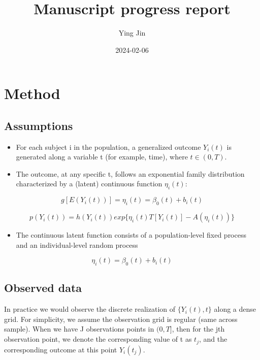 \documentclass[
]{article}
\title{Manuscript progress report}
\author{Ying Jin}
\date{2024-02-06}
\providecommand{\tightlist}{%
  \setlength{\itemsep}{0pt}\setlength{\parskip}{0pt}}
\begin{document}
\maketitle

{
\setcounter{tocdepth}{3}
\tableofcontents
}
\hypertarget{method}{%
\section{Method}\label{method}}

\hypertarget{assumptions}{%
\subsection{Assumptions}\label{assumptions}}

\begin{itemize}
\tightlist
\item
  For each subject i in the population, a generalized outcome \(Y_i(t)\)
  is generated along a variable t (for example, time), where
  \(t \in (0, T)\).
\item
  The outcome, at any specific t, follows an exponential family
  distribution characterized by a (latent) continuous function
  \(\eta_i(t)\):
\end{itemize}

\[g[E(Y_i(t))] = \eta_i(t) = \beta_0(t)+b_i(t)\]

\[p(Y_i(t)) = h(Y_i(t))exp\{\eta_i(t)T[Y_i(t)]-A(\eta_i(t))\}\]

\begin{itemize}
\tightlist
\item
  The continuous latent function consists of a population-level fixed
  process and an individual-level random process
\end{itemize}

\[\eta_i(t) = \beta_0(t)+b_i(t)\]

\hypertarget{observed-data}{%
\subsection{Observed data}\label{observed-data}}

In practice we would observe the discrete realization of
\(\{Y_i(t), t\}\) along a dense grid. For simplicity, we assume the
observation grid is regular (same across sample). When we have J
observations points in \((0, T]\), then for the jth observation point,
we denote the corresponding value of t as \(t_j\), and the corresponding
outcome at this point \(Y_i(t_j)\).
\end{document}
